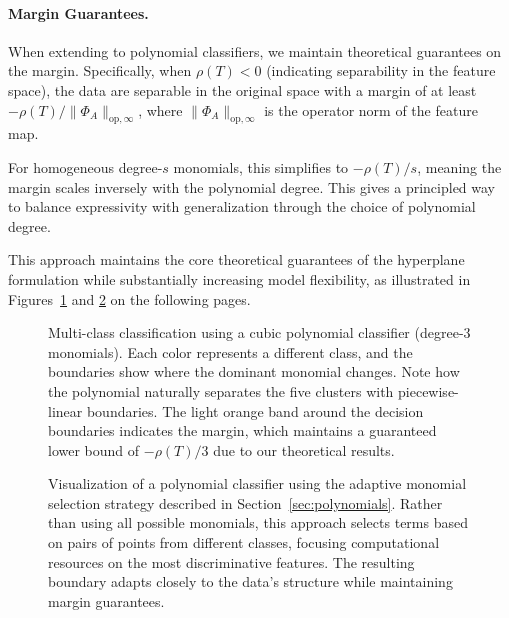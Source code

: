 \documentclass{article}
\begin{document}
\paragraph{Margin Guarantees.}
When extending to polynomial classifiers, we maintain theoretical guarantees on the margin. Specifically, when $\rho(T)<0$ (indicating separability in the feature space), the data are separable in the original space with a margin of at least $-\rho(T)/\lVert \Phi_A\rVert_{\text{op},\infty}$, where $\lVert \Phi_A\rVert_{\text{op},\infty}$ is the operator norm of the feature map.

For homogeneous degree-$s$ monomials, this simplifies to $-\rho(T)/s$, meaning the margin scales inversely with the polynomial degree. This gives a principled way to balance expressivity with generalization through the choice of polynomial degree.

This approach maintains the core theoretical guarantees of the hyperplane formulation while substantially increasing model flexibility, as illustrated in Figures~\ref{fig:homogeneous_selection} and \ref{fig:adaptive_polynomial} on the following pages.

\newpage

\vspace*{3em}
\begin{figure}[ht!]
    \centering
    \resizebox{0.7\textwidth}{!}{\clipbox{0.15\width{} 0.30\height{} 0.15\width{} 0.30\height{}}{}}
    \caption{Multi-class classification using a cubic polynomial classifier (degree-3 monomials). Each color represents a different class, and the boundaries show where the dominant monomial changes. Note how the polynomial naturally separates the five clusters with piecewise-linear boundaries. The light orange band around the decision boundaries indicates the margin, which maintains a guaranteed lower bound of $-\rho(T)/3$ due to our theoretical results.}
    \label{fig:homogeneous_selection}
\end{figure}
\vspace*{4em}
\begin{figure}[ht!]
    \centering
    \resizebox{0.7\textwidth}{!}{\clipbox{0.15\width{} 0.30\height{} 0.15\width{} 0.30\height{}}{}}
    \caption{Visualization of a polynomial classifier using the adaptive monomial selection strategy described in Section~\ref{sec:polynomials}. Rather than using all possible monomials, this approach selects terms based on pairs of points from different classes, focusing computational resources on the most discriminative features. The resulting boundary adapts closely to the data's structure while maintaining margin guarantees.}
    \label{fig:adaptive_polynomial}
\end{figure}
\vspace*{3em}
\end{document}
